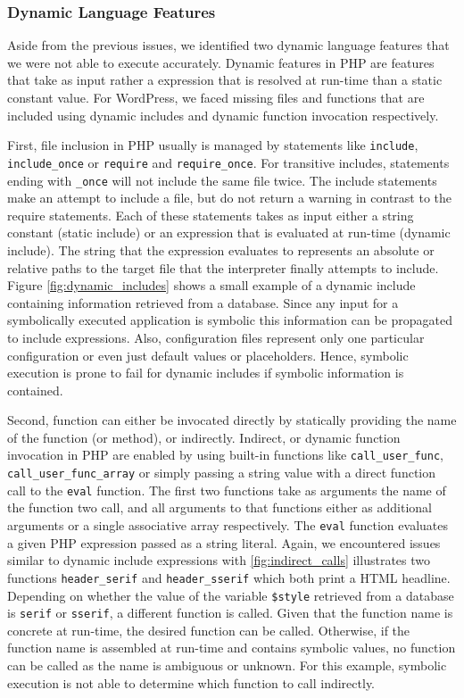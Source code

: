 \documentclass[sigconf]{acmart}
\renewcommand{\sf}[1]{\textsf{#1}}
\renewcommand{\tt}[1]{\texttt{#1}}
\begin{document}
\subsubsection{Dynamic Language Features}
\label{sec:experiment_dynamicfeatures} 
Aside from the previous issues, we identified two dynamic language features
that we were not able to execute accurately. Dynamic features in PHP are
features that take as input rather a expression that is resolved at run-time
than a static constant value. For \sf{WordPress}, we faced missing files and
functions that are included using dynamic includes and dynamic function
invocation respectively.

First, file inclusion in PHP usually is managed by statements like \tt{include},
\tt{include\_once} or \tt{require} and \tt{require\_once}. For transitive
includes, statements ending with \tt{\_once} will not include the same file
twice. The include statements make an attempt to include a file, but do not
return a warning in contrast to the require statements. Each of these
statements takes as input either a string constant (static include) or an
expression that is evaluated at run-time (dynamic include). The string that the
expression evaluates to represents an absolute or relative paths to the target
file that the interpreter finally attempts to include.
Figure \ref{fig:dynamic_includes} shows a small example of a dynamic include containing
information retrieved from a database. Since any input for a symbolically
executed application is symbolic this information can be propagated to include
expressions. Also, configuration files represent only one particular
configuration or even just default values or placeholders. Hence, symbolic
execution is prone to fail for dynamic includes if symbolic information is contained.

Second, function can either be invocated directly by statically providing the
name of the function (or method), or indirectly. Indirect, or dynamic function
invocation in PHP are enabled by using built-in functions like \tt{call\_user\_func},
\tt{call\_user\_func\_array} or simply passing a string value with a direct
function call to the \tt{eval} function. The first two functions take as
arguments the name of the function two call, and all arguments to that
functions either as additional arguments or a single associative array
respectively.
The \tt{eval} function evaluates a given PHP expression passed as a string
literal.
Again, we encountered issues similar to dynamic include expressions with
\ref{fig:indirect_calls} illustrates two functions \tt{header\_serif} and
\tt{header\_sserif} which both print a HTML headline. Depending on whether the
value of the variable \tt{\$style} retrieved from a database is \tt{serif} or
\tt{sserif}, a different function is called. Given that the function name is 
concrete at run-time, the desired function can be called. Otherwise, if the
function name is assembled at run-time and contains symbolic values, no function
can be called as the name is ambiguous or unknown. For this example, symbolic
execution is not able to determine which function to call indirectly.
\end{document}
